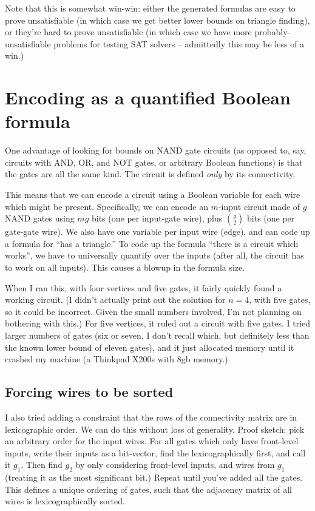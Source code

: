 \documentclass[12pt]{article}
\begin{document}
Note that this is somewhat win-win: either the generated formulas are easy to
prove unsatisfiable (in which case we get better lower bounds on triangle finding),
or they're hard to prove unsatisfiable (in which case we have more probably-unsatisfiable
problems for testing SAT solvers -- admittedly this may be less of a win.)

\section{Encoding as a quantified Boolean formula}

One advantage of looking for bounds on NAND gate circuits
(as opposed to, say, circuits with AND, OR, and NOT gates,
or arbitrary Boolean functions) is that the gates are all
the same kind. The circuit is defined {\em only} by its
connectivity.

This means that we can encode a circuit
using a Boolean variable for each wire which might be
present. Specifically, we can encode an $m$-input circuit
made of $g$ NAND gates using $mg$ bits (one per input-gate
wire), plus $g \choose 2$ bits (one per gate-gate wire).
We also have one variable per input wire (edge), and can code up
a formula for ``has a triangle.''
To code up the formula ``there is a circuit which works'', we
have to universally quantify over the inputs (after all, the
circuit has to work on all inputs). This causes a
blowup in the formula size.

When I ran this, with four vertices and five gates, it
fairly quickly found a working circuit. 
(I didn't actually print out the solution for $n=4$, with
five gates, so it could be incorrect. Given the small numbers
involved, I'm not planning on bothering with this.)
For five vertices, it ruled out a circuit with five gates.
I tried larger numbers of gates (six or seven, I don't recall
which, but definitely less than the known lower bound of eleven
gates), and it just allocated memory until it crashed
my machine (a Thinkpad X200s with 8gb memory.)

\subsection{Forcing wires to be sorted}

I also tried adding a constraint that the rows of
the connectivity matrix are in lexicographic order.
We can do this without loss of generality. Proof sketch:
pick an arbitrary order for the input wires. For all gates
which only have front-level inputs, write their inputs as
a bit-vector, find the lexicographically first, and call it
$g_1$. Then find $g_2$ by only considering front-level inputs,
and wires from $g_1$ (treating it as the most significant bit.)
Repeat until you've added all the gates.
This defines a unique ordering of gates, such that the adjacency
matrix of all wires is lexicographically sorted.
\end{document}
